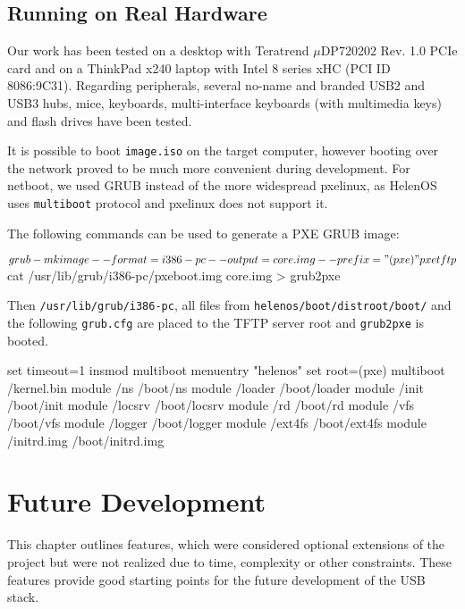
\subsection{Running on Real Hardware}

Our work has been tested on a desktop with Teratrend $\mu$DP720202 Rev. 1.0
PCIe card and on a ThinkPad x240 laptop with Intel 8 series xHC (PCI ID
8086:9C31).  Regarding peripherals, several no-name and branded USB2 and USB3
hubs, mice, keyboards, multi-interface keyboards (with multimedia keys) and
flash drives have been tested.

It is possible to boot \texttt{image.iso} on the target computer, however
booting over the network proved to be much more convenient during development.
For netboot, we used GRUB instead of the more widespread pxelinux, as HelenOS
uses \texttt{multiboot} protocol and pxelinux does not support it.

The following commands can be used to generate a PXE GRUB image:

\begin{bdsh}
$ grub-mkimage --format=i386-pc --output=core.img --prefix="(pxe)" pxe tftp
$ cat /usr/lib/grub/i386-pc/pxeboot.img core.img > grub2pxe
\end{bdsh}

Then \texttt{/usr/lib/grub/i386-pc}, all files from
\texttt{helenos/boot/distroot/boot/} and the following \texttt{grub.cfg} are
placed to the TFTP server root and \texttt{grub2pxe} is booted.

\begin{bdsh}
set timeout=1
insmod multiboot
menuentry "helenos" {
  set root=(pxe)
  multiboot /kernel.bin
  module    /ns /boot/ns
  module    /loader /boot/loader
  module    /init /boot/init
  module    /locsrv /boot/locsrv
  module    /rd /boot/rd
  module    /vfs /boot/vfs
  module    /logger /boot/logger
  module    /ext4fs /boot/ext4fs
  module    /initrd.img /boot/initrd.img
}
\end{bdsh}

\section{Future Development}

This chapter outlines features, which were considered optional extensions of
the project but were not realized due to time, complexity or other constraints.
These features provide good starting points for the future development of the
USB stack.

